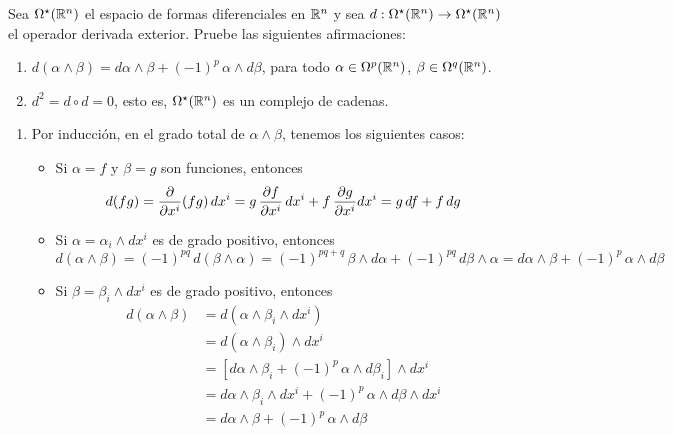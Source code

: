\begin{exercise}
Sea $\Omega^\star(\mathbb R^n)$ el espacio de formas diferenciales en $\mathbb R^n$ y sea $d : \Omega^\star(\mathbb R^n) \to \Omega^\star(\mathbb R^n)$ el operador derivada exterior. Pruebe las siguientes afirmaciones:
\begin{enumerate}[label=\alph*)]
    \item $d(\alpha \wedge \beta) = d\alpha \wedge \beta + (-1)^p \, \alpha \wedge d\beta$, para todo $\alpha \in \Omega^p(\mathbb R^n)$, $\beta \in \Omega^q(\mathbb R^n)$.
    
    \item $d^2 = d \circ d = 0$, esto es, $\Omega^\star(\mathbb R^n)$ es un complejo de cadenas.
\end{enumerate}
\end{exercise}

\begin{solution}
\leavevmode
\begin{enumerate}[label=\alph*)]
    \item Por inducción, en el grado total de $\alpha \wedge \beta$, tenemos los siguientes casos:
    \begin{itemize}
        \item Si $\alpha = f$ y $\beta = g$ son funciones, entonces
        $$
        d(fg)
            = \frac {\partial } {\partial x^i} (fg) \, dx^i
            = g \, \frac {\partial f} {\partial x^i} \, dx^i + f \, \frac {\partial g} {\partial x^i} dx^i
            = g \, df + f \, dg
        $$
        
        \item Si $\alpha = \alpha_i \wedge dx^i$ es de grado positivo, entonces
        $$
        d(\alpha \wedge \beta)
            = (-1)^{pq} \, d(\beta \wedge \alpha)
            = (-1)^{pq+q} \, \beta \wedge d\alpha + (-1)^{pq} \, d\beta \wedge \alpha
            = d\alpha \wedge \beta + (-1)^p \, \alpha \wedge d\beta
        $$
        
        \item Si $\beta = \beta_i \wedge dx^i$ es de grado positivo, entonces
        \begin{align*}
        d(\alpha \wedge \beta)
            &= d(\alpha \wedge \beta_i \wedge dx^i) \\
            &= d(\alpha \wedge \beta_i) \wedge dx^i \\
            &= [d\alpha \wedge \beta_i + (-1)^p \, \alpha \wedge d\beta_i] \wedge dx^i \\
            &= d\alpha \wedge \beta_i \wedge dx^i + (-1)^p \, \alpha \wedge d\beta \wedge dx^i \\
            &= d\alpha \wedge \beta + (-1)^p \, \alpha \wedge d\beta
        \end{align*}
    \end{itemize}
    

\end{enumerate}
\end{solution}
